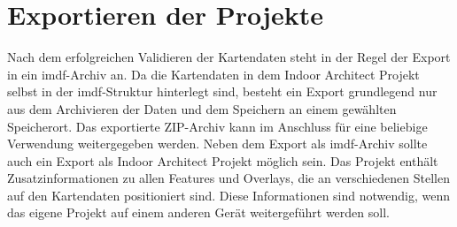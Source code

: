 \section{Exportieren der Projekte}
Nach dem erfolgreichen Validieren der Kartendaten steht in der Regel der Export in ein \ac{imdf}-Archiv an.
Da die Kartendaten in dem Indoor Architect Projekt selbst in der \ac{imdf}-Struktur hinterlegt sind, besteht ein Export grundlegend nur aus dem Archivieren der Daten und dem Speichern an einem gewählten Speicherort.
Das exportierte ZIP-Archiv kann im Anschluss für eine beliebige Verwendung weitergegeben werden.\pbreak%
%
Neben dem Export als \ac{imdf}-Archiv sollte auch ein Export als Indoor Architect Projekt möglich sein.
Das Projekt enthält Zusatzinformationen zu allen Features und Overlays, die an verschiedenen Stellen auf den Kartendaten positioniert sind.
Diese Informationen sind notwendig, wenn das eigene Projekt auf einem anderen Gerät weitergeführt werden soll.
